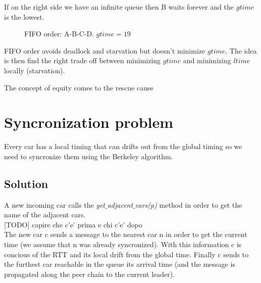If on the right side we have an infinite queue then B waits forever and the 
$gtime$ is the lowest.

\begin{figure}[h]
    \centering
    \caption{FIFO order: A-B-C-D. $gtime = 19$} \label{fig:1}
\end{figure}

FIFO order avoids deadlock and starvation but doesn't minimize $gtime$. 
The idea is then find the right trade off between minimizing 
$gtime$ and minimizing $ltime$ locally (starvation).

The concept of equity comes to the rescue cause 


\section{Syncronization problem}

Every car has a local timing that can drifts out from the global timing so we need 
to syncronize them using the Berkeley algorithm.


\subsection{Solution}

A new incoming car calls the \textit{get$\_$adjacent$\_$cars(p)} method in order to get 
the name of the adjacent cars. \\

[TODO] capire che c'e' prima e chi c'e' dopo\\

The new car c sends a message to the nearest car n in order to get the current time 
(we assume that n was already syncronized). With this information c is concious of the 
RTT and its local drift from the global time. Finally c sends to the furthest car 
reachable in the queue its arrival time (and the message is propagated along the 
peer chain to the current leader).\\

